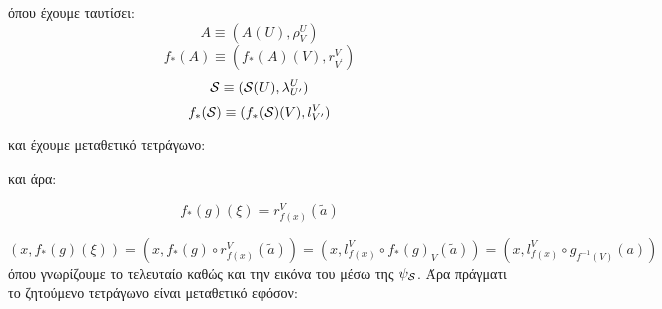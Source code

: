 \begin{figure}[H]
    \centering
\end{figure}

\noindent όπου έχουμε ταυτίσει:
$$A \equiv (A(U),\rho^U_V)$$
$$f_*(A) \equiv (f_*(A)(V),r^V_{V^{\prime}})$$
$$\mathcal{S} \equiv (\mathcal{S} (U),\lambda^U_{U^{\prime}})$$
$$f_*(\mathcal{S}) \equiv (f_*(\mathcal{S})(V), l^V_{V^{\prime}})$$

\noindent και έχουμε μεταθετικό τετράγωνο:

\begin{figure}[H]
    \centering
\end{figure}

\noindent και άρα:

$$f_*(g)(\xi) = r^V_{f(x)}(\tilde{a})$$

$$(x,f_*(g)(\xi)) = (x,f_*(g)\circ r^V_{f(x)}(\tilde{a})) =  (x,l^V_{f(x)}\circ f_*(g)_V(\tilde{a})) =  (x,l^V_{f(x)}\circ g_{f^{-1}(V)}(a))$$ όπου γνωρίζουμε το τελευταίο καθώς και την εικόνα του μέσω της $\psi_{\mathcal{S}}$. Άρα πράγματι το ζητούμενο τετράγωνο είναι μεταθετικό εφόσον:

\begin{figure}[H]
    \centering
\end{figure}
